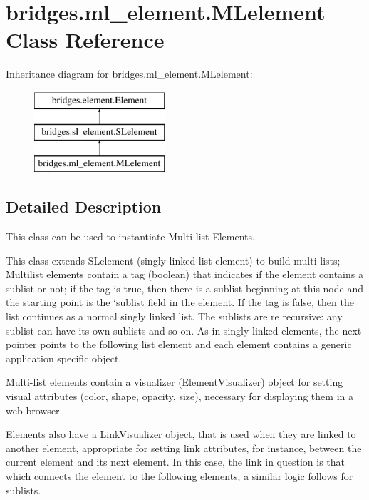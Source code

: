 \hypertarget{classbridges_1_1ml__element_1_1_m_lelement}{}\section{bridges.\+ml\+\_\+element.\+M\+Lelement Class Reference}
\label{classbridges_1_1ml__element_1_1_m_lelement}
Inheritance diagram for bridges.\+ml\+\_\+element.\+M\+Lelement\+:\begin{figure}[H]
\begin{center}
\leavevmode
\includegraphics[height=3.000000cm]{classbridges_1_1ml__element_1_1_m_lelement}
\end{center}
\end{figure}


\subsection{Detailed Description}
This class can be used to instantiate Multi-\/list Elements. 

This class extends S\+Lelement (singly linked list element) to build multi-\/lists; Multilist elements contain a tag (boolean) that indicates if the element contains a sublist or not; if the tag is true, then there is a sublist beginning at this node and the starting point is the `sublist\textquotesingle{} field in the element. If the tag is false, then the list continues as a normal singly linked list. The sublists are re recursive\+: any sublist can have its own sublists and so on. As in singly linked elements, the next pointer points to the following list element and each element contains a generic application specific object.

Multi-\/list elements contain a visualizer (Element\+Visualizer) object for setting visual attributes (color, shape, opacity, size), necessary for displaying them in a web browser.

Elements also have a Link\+Visualizer object, that is used when they are linked to another element, appropriate for setting link attributes, for instance, between the current element and its next element. In this case, the link in question is that which connects the element to the following elements; a similar logic follows for sublists.

